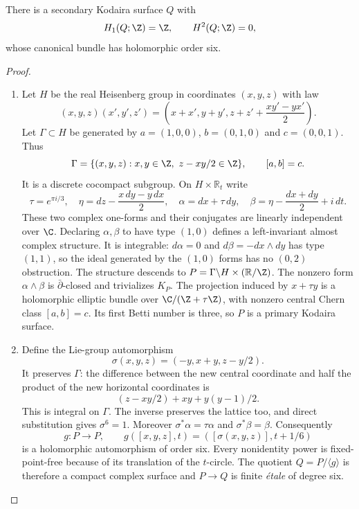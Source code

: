 \begin{proposition}\hypertarget{tag-01F8}{}\label{cdp:st:C.3.2}


There is a secondary Kodaira surface $Q$ with
\[
H_1(Q;\Z)=\Z,\qquad H^2(Q;\Z)=0,
\]
whose canonical bundle has holomorphic order six.
\end{proposition}


\begin{proof}

\begin{enumerate}[label={$\langle1\rangle$\arabic*.},leftmargin=*]
\item Let $H$ be the real Heisenberg group in coordinates $(x,y,z)$ with law
\[
(x,y,z)(x',y',z')
=\left(x+x',y+y',z+z'+\frac{xy'-yx'}2\right).
\]
Let $\Gamma\subset H$ be generated by
$a=(1,0,0)$, $b=(0,1,0)$ and $c=(0,0,1)$. Thus
\[
\Gamma=\{(x,y,z):x,y\in\Z,\ z-xy/2\in\Z\},
\qquad [a,b]=c.
\]
It is a discrete cocompact subgroup. On $H\times\mathbb R_t$ write
\[
\tau=e^{\pi i/3},\quad
\eta=dz-\frac{x\,dy-y\,dx}{2},\quad
\alpha=dx+\tau\,dy,\quad
\beta=\eta-\frac{dx+dy}{2}+i\,dt.
\]
These two complex one-forms and their conjugates are linearly
independent over $\C$. Declaring $\alpha,\beta$ to have type $(1,0)$
defines a left-invariant almost complex structure. It is integrable:
$d\alpha=0$ and $d\beta=-dx\wedge dy$ has type $(1,1)$, so the
ideal generated by the $(1,0)$ forms has no $(0,2)$ obstruction.
The structure descends to
$P=\Gamma\backslash H\times(\mathbb R/\Z)$.
The nonzero form $\alpha\wedge\beta$ is $\bar\partial$-closed and
trivializes $K_P$. The projection induced by $x+\tau y$ is a
holomorphic elliptic bundle over $\C/(\Z+\tau\Z)$, with nonzero
central Chern class $[a,b]=c$. Its first Betti number is three, so
$P$ is a primary Kodaira surface.

\item Define the Lie-group automorphism
\[
\sigma(x,y,z)=(-y,x+y,z-y/2).
\]
It preserves $\Gamma$: the difference between the new central
coordinate and half the product of the new horizontal coordinates
is
\[
(z-xy/2)+xy+y(y-1)/2.
\]
This is integral on $\Gamma$. The inverse preserves the lattice too,
and direct substitution gives $\sigma^6=1$. Moreover
$\sigma^*\alpha=\tau\alpha$ and $\sigma^*\beta=\beta$.
Consequently
\[
g:P\longrightarrow P,\qquad
g([x,y,z],t)=([\sigma(x,y,z)],t+1/6)
\]
is a holomorphic automorphism of order six. Every nonidentity power
is fixed-point-free because of its translation of the $t$-circle.
The quotient $Q=P/\langle g\rangle$ is therefore a compact complex
surface and $P\to Q$ is finite \emph{\'etale} of degree six.


\end{enumerate}
\end{proof}
